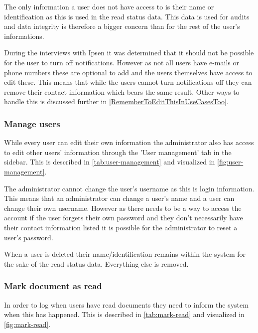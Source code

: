 


The only information a user does not have access to is their name or identification as this is used in the read status data.
This data is used for audits and data integrity is therefore a bigger concern than for the rest of the user's informations.

During the interviews with Ipsen it was determined that it should not be possible for the user to turn off notifications.
However as not all users have e-mails or phone numbers these are optional to add and the users themselves have access to edit these.
This means that while the users cannot turn notifications off they can remove their contact information which bears the same result. 
Other ways to handle this is discussed further in \cref{RememberToEditThisInUseCasesToo}.

\subsubsection{Manage users}
While every user can edit their own information the administrator also has access to edit other users' information through the 'User management' tab in the sidebar.
This is described in \cref{tab:user-management} and visualized in \cref{fig:user-management}.




The administrator cannot change the user's username as this is login information. 
This means that an administrator can change a user's name and a user can change their own username.
However as there needs to be a way to access the account if the user forgets their own password and they don't necessarily have their contact information listed it is possible for the administrator to reset a user's password.

When a user is deleted their name/identification remains within the system for the sake of the read status data.
Everything else is removed.

\subsubsection{Mark document as read}
In order to log when users have read documents they need to inform the system when this has happened.
This is described in \cref{tab:mark-read} and visualized in \cref{fig:mark-read}.

